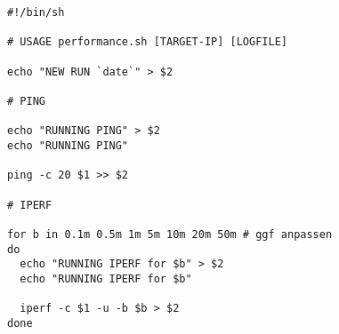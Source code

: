 \documentclass[a4paper,10pt]{article}
\begin{document}
\begin{lstlisting}
#!/bin/sh

# USAGE performance.sh [TARGET-IP] [LOGFILE]

echo "NEW RUN `date`" > $2

# PING

echo "RUNNING PING" > $2
echo "RUNNING PING"

ping -c 20 $1 >> $2

# IPERF

for b in 0.1m 0.5m 1m 5m 10m 20m 50m # ggf anpassen
do
  echo "RUNNING IPERF for $b" > $2
  echo "RUNNING IPERF for $b"

  iperf -c $1 -u -b $b > $2
done
\end{lstlisting}
\end{document}
